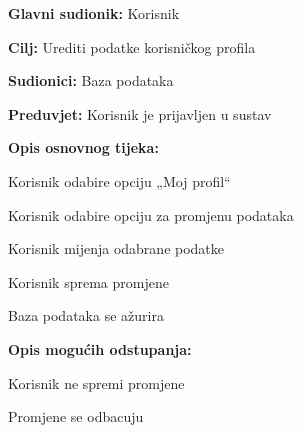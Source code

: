 				
				\noindent {}
				\begin{packed_item}
					
					\item \textbf{Glavni sudionik: }Korisnik
					\item  \textbf{Cilj:} Urediti podatke korisničkog profila
					\item  \textbf{Sudionici:} Baza podataka
					\item  \textbf{Preduvjet:} Korisnik je prijavljen u sustav
					\item  \textbf{Opis osnovnog tijeka:}
					
					\item[] \begin{packed_enum}
						
						\item Korisnik odabire opciju „Moj profil“
						\item Korisnik odabire opciju za promjenu podataka
						\item Korisnik mijenja odabrane podatke
						\item Korisnik sprema promjene
						\item Baza podataka se ažurira
					\end{packed_enum}
					
					\item  \textbf{Opis mogućih odstupanja:}
					
					\item[] \begin{packed_item}
						
						\item[4.a] Korisnik ne spremi promjene
						\item[] \begin{packed_enum}
							
							\item Promjene se odbacuju
							
						\end{packed_enum}

					\end{packed_item}
				\end{packed_item}
			

